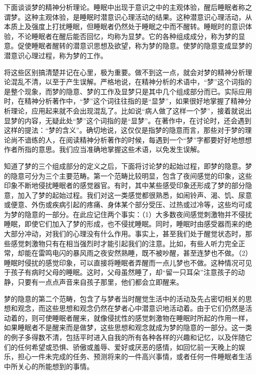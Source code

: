 \documentclass[UTF8,10pt,a4paper,openany]{book}
\begin{document}
下面谈谈梦的精神分析理论。睡眠中出现于意识之中的主观体验，醒后睡眠者称之谓梦。这种主观体验，是睡眠时潜意识心理活动的结果。这种潜意识心理活动，从本质上及强度上打扰睡眠，但睡眠者仍然处于睡眠之中而不醒转。睡眠时的意识体验，不论睡眠者在醒后能否回忆，均称为显梦。它的各种组成成分，称为梦的显意。促使睡眠者醒转的潜意识思想及欲望，称为梦的隐意。使梦的隐意变成显梦的潜意识心理过程，称为梦的工作。

将这些区别搞清楚并记在心里，极为重要。做不到这一点，就会对梦的精神分析理论混乱不清，以至于产生误解。严格地说，在精神分析的术语中，“梦”这个词指的是整个现象，而梦的隐意、梦的工作及显梦只是其中几个组成部分而已。实际应用时，在精神分析著作中，“梦”这个词往往指的是“显梦”，如果很好地掌握了精神分析理论，应用起来就不会出现混乱了。比如说“病人做了这样一个梦”，接着就说出显梦的内容，无疑此处“梦”这个词指的是“显梦”。在著作中，在讨论时，还会遇到这样的提法：“梦的含义”。确切地说，这仅仅是指梦的隐意而言，那些对于梦的理论尚不谙练的人，在阅读精神分析著作的时候，每遇到一个“梦”字都要好好地想想作者所指的意思。我们应当准确地掌握这些术语，以免发生误解。

知道了梦的三个组成部分的定义之后，下面将讨论梦的起始过程，即梦的隐意。梦的隐意可分为三个主要范畴。第一个范畴比较明显，包含了夜间感觉的印象，这些印象不断地侵扰睡眠者的感觉器官。有时，其中某些感受印象还形成了梦的部分隐意，加入了梦的起始过程。我们对这一类感觉都很熟悉，如闹铃声、渴、饥、尿意或便意、外伤或疾病引起的疼痛、身体某个部分受压、过热或过冷等，这些均可成为梦的隐意的一部分。在此应记住两个事实：（1）大多数夜间感觉刺激物并不侵扰睡眠，即使它们加入了梦的形成，也不侵扰睡眠。同时，睡眠时由感受器而来的绝大部分冲动，对我们的心理没有什么作用。事实上，甚至我们处于醒觉状态时，那些感觉刺激物只有在相当强烈时才能引起我们的注意。比如，有些人听力完全正常，却能在雷鸣电闪的暴风雨之夜安然熟睡，既不被吵醒，甚至连梦也不做。（2）睡眠时侵扰的感觉印象，可以直接将睡眠者弄醒而一点儿梦也不做。这种情况可见于孩子有病时父母的睡眠。这时，父母虽然睡了，却“留一只耳朵”注意孩子的动静，只要有一点点声音来自孩子那里，他们都会立即醒来。

梦的隐意的第二个范畴，包含了与梦者当时醒觉生活中的活动及先占密切相关的思想和观念，而这些思想和观念仍然在梦者心中潜意识地活动着。由于它们仍然是活动着的，则可使睡眠者醒来，就像侵扰性的感觉刺激物在睡眠时所起的作用一样，如果睡眠者不是醒来而是做梦，这些思想和观念就成为梦的隐意的一部分。这一类的例子多得数不清，包括平时进入自我的所有各种各样的兴趣和记忆，以及伴随它们的任何希望或恐惧、骄傲或羞辱、爱好或厌恶的感情，如回忆前一天晚上的娱乐，担心一件未完成的任务、预测将来的一件高兴事情，或者任何一件睡眠者生活中所关心的所能想到的事情。
\end{document}
